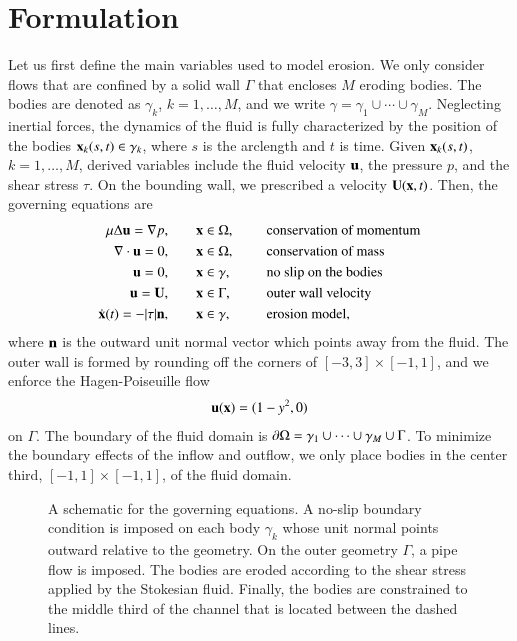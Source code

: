 \documentclass[preprint, 10pt]{elsarticle}
\begin{document}
\section{Formulation\label{s:formulation}} 
Let us first define the main variables used to model erosion.  We only
consider flows that are confined by a solid wall $\Gamma$ that encloses
$M$ eroding bodies.  The bodies are denoted as $\gamma_k$,
$k=1,\ldots,M$, and we write $\gamma = \gamma_1 \cup \cdots \cup
\gamma_M$.  Neglecting inertial forces, the dynamics of the fluid is
fully characterized by the position of the bodies ${\mathbf{x}}_k(s,t) \in
\gamma_k$, where $s$ is the arclength and $t$ is time.  Given
${\mathbf{x}}_k(s,t)$, $k=1,\ldots,M$, derived variables include the fluid
velocity ${\mathbf{u}}$, the pressure $p$, and the shear stress $\tau$.   On the
bounding wall, we prescribed a velocity ${\mathbf{U}}({\mathbf{x}},t)$.  Then, the
governing equations are
\begin{equation}
\label{eqn:erosionModel}
\begin{split}
  \mu \Delta {\mathbf{u}} = {\nabla} p, &\hspace{20pt} {\mathbf{x}} \in \Omega, \hspace*{.2in} &&\mbox{conservation
of momentum}\\
{\nabla} \cdot {\mathbf{u}} = 0, &\hspace{20pt} {\mathbf{x}} \in \Omega, \hspace*{.2in}
&&\mbox{conservation of mass} \\
{\mathbf{u}} = 0, &\hspace{20pt} {\mathbf{x}} \in \gamma, \hspace*{.2in} &&\mbox{no slip on the
bodies} \\
{\mathbf{u}} = {\mathbf{U}}, &\hspace{20pt} {\mathbf{x}} \in \Gamma, \hspace*{.2in} &&\mbox{outer wall
velocity} \\
\dot{{\mathbf{x}}}(t) = -|\tau| {\mathbf{n}}, &\hspace{20pt} {\mathbf{x}} \in \gamma,
&&\mbox{erosion model},
\end{split}
\end{equation}
where ${\mathbf{n}}$ is the outward unit normal vector which points away from the
fluid.  The outer wall is formed by rounding off the corners of $[-3,3]
\times [-1,1]$, and we enforce the Hagen-Poiseuille flow
\begin{align*}
  {\mathbf{u}}({\mathbf{x}}) = (1-y^2,0)
\end{align*}
on $\Gamma$.  The boundary of the fluid domain is ${\partial}\Omega = \gamma_1
\cup \cdots \cup \gamma_M \cup \Gamma$.  To minimize the boundary
effects of the inflow and outflow, we only place bodies in the center
third, $[-1,1] \times [-1,1]$, of the fluid domain.
\begin{figure}[htpb]
  \centering
  
  \caption{\label{fig:schematic} A schematic for the governing
    equations.  A no-slip boundary condition is imposed on each body
    $\gamma_k$ whose unit normal points outward relative to the
    geometry.  On the outer geometry $\Gamma$, a pipe flow is imposed.
    The bodies are eroded according to the shear stress applied by the
    Stokesian fluid.  Finally, the bodies are constrained to the middle
    third of the channel that is located between the dashed lines.}
\end{figure}
\end{document}
